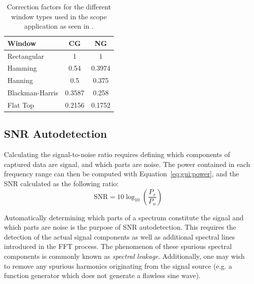 \begin{table}
    \centering
    \caption[Window Correction Factors]{%
        Correction factors  for the different  window types used in  the scope
        application as seen in \cite{gui:hanspi}.%
    }
    \label{tab:gui:corrfactors}
    \begin{tabular}{lSS}
        \toprule
        Window          & {CG}   & {NG}\\
        \midrule
        Rectangular     & 1      & 1\\
        Hamming         & 0.54   & 0.3974\\
        Hanning         & 0.5    & 0.375\\
        Blackman-Harris & 0.3587 & 0.258\\
        Flat Top        & 0.2156 & 0.1752\\
        \bottomrule
    \end{tabular}
\end{table}


%
%
\subsection{SNR Autodetection} %
\label{subsec:gui:snr_autodetection}

Calculating the  signal-to-noise ratio  requires defining which  components of
captured data  are signal, and which  parts are noise. The power  contained in
each frequency  range can  then be computed  with Equation~\ref{eq:gui:power},
and the SNR calculated as the following ratio:
\begin{equation}
    \mathrm{SNR} = 10\log_{10}(\frac{P_s}{P_n})
    \label{eq:gui:snr}
\end{equation}

Automatically determining which parts of  a spectrum constitute the signal and
which parts are  noise is the purpose of SNR  autodetection. This requires the
detection of the actual signal components as well as additional spectral lines
introduced  in the  FFT  process. The phenomenon  of  these spurious  spectral
components is commonly known as \emph{spectral leakage}. Additionally, one may
wish to remove any spurious harmonics originating from the signal source (e.g.
a function generator which does not generate a flawless sine wave).


